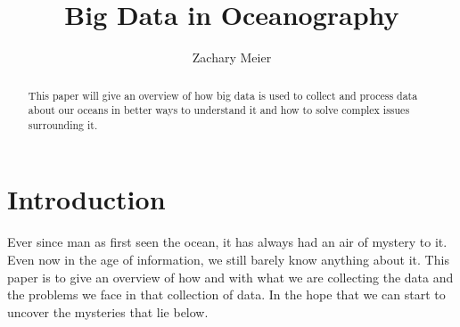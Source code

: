 \documentclass[sigconf]{acmart}
\begin{document}
\title{Big Data in Oceanography}
\author{Zachary Meier}
\renewcommand{\shortauthors}{B. Trovato et al.}
\begin{abstract}
This paper will give an overview of how big data is used to collect and process data about our oceans in better ways to understand it and how to solve complex issues surrounding it.
 
\end{abstract}
\maketitle
\section{Introduction}
Ever since man as first seen the ocean, it has always had an air of mystery to it.  Even now in the age of information, we still barely know anything about it.  This paper is to give an overview of how and with what we are collecting the data and the problems we face in that collection of data.  In the hope that we can start to uncover the mysteries that lie below.
\end{document}
